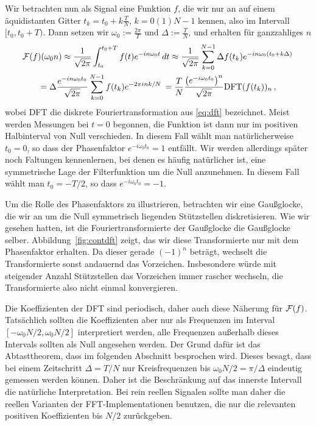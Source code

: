 Wir betrachten nun als Signal eine Funktion $f$, die wir nur an auf
einem äquidistanten Gitter $t_k = t_0 + k\frac{T}{N}$, $k=0(1)N-1$
kennen, also im Intervall $[t_0, t_0 + T)$. Dann setzen wir
$\omega_0:=\frac{2\pi}{T}$ und $\Delta := \frac{T}{N}$, und erhalten
für ganzzahliges $n$
\begin{multline}
  \label{eq:dftcont}
  \mathcal F(f)(\omega_0 n)\approx
  \frac{1}{\sqrt{2\pi}}\int_{t_0}^{t_0 + T} f(t)e^{-i n \omega_0 t}\, dt
  \approx
  \frac{1}{\sqrt{2\pi}}\sum_{k=0}^{N-1}
  \Delta f(t_k)
  e^{-i n\omega_0 \left(t_0 + k\Delta\right)}\,
  \\
  =   \Delta \frac{e^{-i n\omega_0 t_0}}{\sqrt{2\pi}}\sum_{k=0}^{N-1}
  f(t_k) e^{-2\pi i n k / N}\,
  =\frac{T}{N}\frac{\left(e^{-i\omega_0 t_0}\right)^n}{\sqrt{2\pi}} \text{DFT}(f(t_k))_n\,,
\end{multline}
wobei DFT die diskrete Fouriertransformation aus \eqref{eq:dft}
bezeichnet. Meist werden Messungen bei $t=0$ begonnen, die Funktion
ist dann nur im positiven Halbinterval von Null verschieden.  In
diesem Fall wählt man natürlicherweise $t_0 = 0$, so dass der Phasenfaktor
$e^{-i\omega_0 t_0} = 1$ entfällt. Wir werden allerdings später noch
Faltungen kennenlernen, bei denen es häufig natürlicher ist, eine
symmetrische Lage der Filterfunktion um die Null anzunehmen. In diesem
Fall wählt man $t_0 = -T/2$, so dass $e^{-i\omega_0 t_0} = -1$.

Um die Rolle des Phasenfaktors zu illustrieren, betrachten wir eine
Gaußglocke, die wir an um die Null symmetrisch liegenden Stützstellen diskretisieren. Wie wir gesehen hatten, ist die Fouriertransformierte
der Gaußglocke die Gaußglocke selber. Abbildung~\ref{fig:contdft} zeigt,
das wir diese Transformierte nur mit dem Phasenfaktor erhalten. Da
dieser gerade $(-1)^n$ beträgt, wechselt die Transformierte sonst andauernd
das Vorzeichen. Insbesondere würde mit steigender Anzahl Stützstellen das
Vorzeichen immer rascher wechseln, die Transformierte also nicht einmal
konvergieren.

Die Koeffizienten der DFT sind periodisch, daher auch diese Näherung
für $\mathcal F(f)$. Tatsächlich sollten die Koeffizienten aber nur als
Frequenzen im Interval $[-\omega_0 N/2,\omega_0 N/2]$ interpretiert
werden, alle Frequenzen außerhalb dieses Intervals sollten als Null
angesehen werden. Der Grund dafür ist das Abtasttheorem, dass im
folgenden Abschnitt besprochen wird. Dieses besagt, dass bei einem
Zeitschritt $\Delta=T/N$ nur Kreisfrequenzen bis $\omega_0 N/2 =
\pi/\Delta$ eindeutig gemessen werden können. Daher ist die
Beschränkung auf das innerste Intervall die natürliche
Interpretation. Bei rein reellen Signalen sollte man daher
die reellen Varianten der FFT-Implementationen benutzen, die
nur die relevanten positiven Koeffizienten bis $N/2$
zurückgeben.

